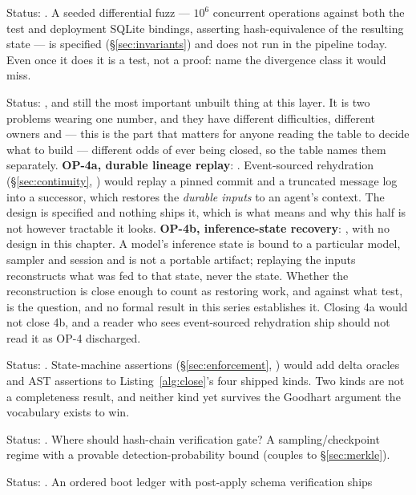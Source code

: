 \documentclass[11pt,a4paper]{article}
\theoremstyle{definition}
\theoremstyle{remark}
\begin{document}
\begin{description}[leftmargin=2.2em,style=nextline]
\item[$\bigstar$ OP-3 --- Cross-runtime soundness.] Status: \Open. A seeded differential
fuzz --- $10^6$ concurrent operations against both the test and deployment SQLite
bindings, asserting hash-equivalence of the resulting state --- is specified
(\S\ref{sec:invariants}) and does not run in the pipeline today. Even once it does
it is a test, not a proof: name the divergence class it would miss.
\item[$\bigstar$ OP-4 --- Checkpoint with teeth.] Status: \Open, and still the most
important unbuilt thing at this layer. It is two problems wearing one number, and
they have different difficulties, different owners and --- this is the part that
matters for anyone reading the table to decide what to build --- different odds of
ever being closed, so the table names them separately.
\textbf{OP-4a, durable lineage replay}: \Open. Event-sourced rehydration
(\S\ref{sec:continuity}, \Designed) would replay a pinned commit and a truncated
message log into a successor, which restores the \emph{durable inputs} to an agent's
context. The design is specified and nothing ships it, which is what \Designed{}
means and why this half is not \Closed{} however tractable it looks.
\textbf{OP-4b, inference-state recovery}: \Open, with no design in this chapter.
A model's inference state is bound to a particular model, sampler and session and is
not a portable artifact; replaying the inputs reconstructs what was fed to that
state, never the state. Whether the reconstruction is close enough to count as
restoring work, and against what test, is the question, and no formal result in
this series establishes it. Closing 4a would not close 4b, and a reader who sees
event-sourced rehydration ship should not read it as OP-4 discharged.
\item[$\bigstar$ OP-5 --- Oracle completeness.] Status: \Open. State-machine assertions
(\S\ref{sec:enforcement}, \Designed) would add delta oracles and AST assertions to
Listing~\ref{alg:close}'s four shipped kinds. Two kinds are not a completeness
result, and neither kind yet survives the Goodhart argument the vocabulary exists to
win.
\item[$\bigstar$ OP-6 --- Tamper-evidence on the read path.] Status: \Open. Where should
hash-chain verification gate? A sampling/checkpoint regime with a provable
detection-probability bound (couples to \S\ref{sec:merkle}).
\item[$\bigstar$ OP-7 --- Schema evolution without a sequencer.] Status: \Partial. An
ordered boot ledger with post-apply schema verification ships

\end{description}
\end{document}
